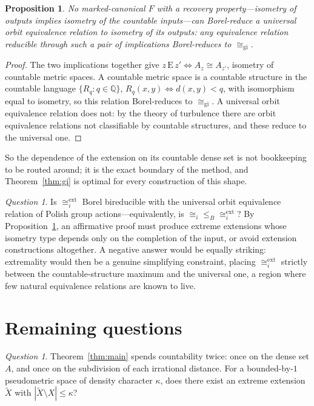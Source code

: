 \documentclass[11pt]{article}
\newtheorem{proposition}[theorem]{Proposition}
\theoremstyle{definition}
\theoremstyle{remark}
\newtheorem{question}[theorem]{Question}
\newcommand{\Q}{\mathbb{Q}}
\newcommand{\E}{\mathrm{E}}
\newcommand{\GI}{\cong_{\mathrm{gi}}}
\newcommand{\isoi}{\cong_i}
\newcommand{\isox}{\cong_i^{\mathrm{ext}}}
\newcommand{\leB}{\leq_B}
\begin{document}
\begin{proposition}\label{prop:obstruction}
No marked-canonical $F$ with a recovery property---isometry of outputs implies isometry of
the countable inputs---can Borel-reduce a universal orbit equivalence relation to isometry
of its outputs: any equivalence relation reducible through such a pair of implications
Borel-reduces to $\GI$.
\end{proposition}

\begin{proof}
The two implications together give $z\,\E\,z'\iff A_z\cong A_{z'}$, isometry of countable
metric spaces. A countable metric space is a countable structure in the countable language
$\{R_q:q\in\Q\}$, $R_q(x,y)\iff d(x,y)<q$, with isomorphism equal to isometry, so this
relation Borel-reduces to $\GI$. A universal orbit equivalence relation does not: by the
theory of turbulence \cite{Hjorth00} there are orbit equivalence relations not classifiable
by countable structures, and these reduce to the universal one.
\end{proof}

So the dependence of the extension on its countable dense set is not bookkeeping to be
routed around; it is the exact boundary of the method, and Theorem~\ref{thm:gi} is optimal
for every construction of this shape.

\begin{question}\label{q:universal}
Is $\isox$ Borel bireducible with the universal orbit equivalence relation of Polish group
actions---equivalently, is $\isoi\leB\isox$? By Proposition~\ref{prop:obstruction}, an
affirmative proof must produce extreme extensions whose isometry type depends only on the
completion of the input, or avoid extension constructions altogether. A negative answer
would be equally striking: extremality would then be a genuine simplifying constraint,
placing $\isox$ strictly between the countable-structure maximum and the universal one, a
region where few natural equivalence relations are known to live.
\end{question}

\section{Remaining questions}
\label{sec:questions}

\begin{question}\label{q:density}
Theorem~\ref{thm:main} spends countability twice: once on the dense set $A$, and once on
the subdivision of each irrational distance. For a bounded-by-$1$ pseudometric space of
density character $\kappa$, does there exist an extreme extension $\tilde X$ with
$|\tilde X\setminus X|\le\kappa$?
\end{question}
\end{document}
